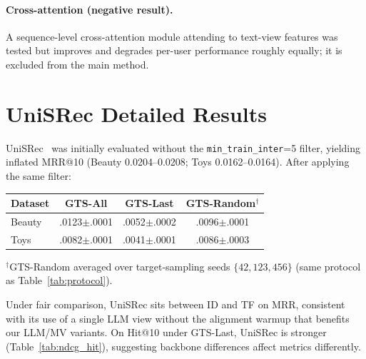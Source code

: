 \documentclass[sigconf,natbib=true,anonymous]{acmart}
\begin{document}
\paragraph{Cross-attention (negative result).}
\label{app:cross}
A sequence-level cross-attention module attending to text-view features was tested but improves and degrades per-user performance roughly equally; it is excluded from the main method.

\section{UniSRec Detailed Results}
\label{app:unisrec}

UniSRec~\cite{hou2022unisrec} was initially evaluated without the \texttt{min\_train\_inter}=5 filter, yielding inflated MRR@10 (Beauty 0.0204--0.0208; Toys 0.0162--0.0164).
After applying the same filter:

\begin{table}[h]
\centering
\small
\begin{tabular}{@{}lccc@{}}
\toprule
Dataset & GTS-All & GTS-Last & GTS-Random$^\dagger$ \\
\midrule
Beauty & .0123$\pm$.0001 & .0052$\pm$.0002 & .0096$\pm$.0001 \\
Toys   & .0082$\pm$.0001 & .0041$\pm$.0001 & .0086$\pm$.0003 \\
\bottomrule
\end{tabular}
\end{table}

\noindent$^\dagger$GTS-Random averaged over target-sampling seeds $\{42,123,456\}$ (same protocol as Table~\ref{tab:protocol}).

Under fair comparison, UniSRec sits between ID and TF on MRR, consistent with its use of a single LLM view without the alignment warmup that benefits our LLM/MV variants.
On Hit@10 under GTS-Last, UniSRec is stronger (Table~\ref{tab:ndcg_hit}), suggesting backbone differences affect metrics differently.



\end{document}
